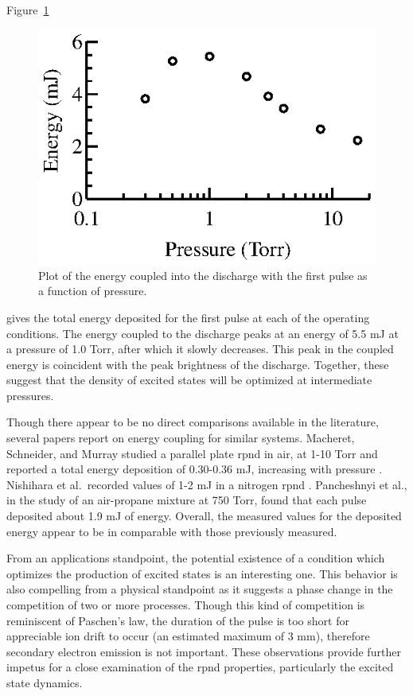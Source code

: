 Figure~\ref{fig:energies}
\begin{figure}
  \centering
  \includegraphics{./chapters/experiment/figures/energies.eps}
  \caption{Plot of the energy coupled into the discharge with the first pulse as
  a function of pressure.}
  \label{fig:energies}
\end{figure}
gives the total energy deposited for the first pulse at each of the operating
conditions. The energy coupled to the discharge peaks at an energy of 5.5 mJ at a
pressure of 1.0 Torr, after which it slowly decreases. This peak in the coupled
energy is coincident with the peak brightness of the discharge. Together, these
suggest that the density of excited states will be optimized at intermediate
pressures. 

Though there appear to be no direct comparisons available in the literature,
several papers report on energy coupling for similar systems. Macheret,
Schneider, and Murray studied a parallel plate \acs{rpnd} in air, at 1-10 Torr
and reported a total energy deposition of 0.30-0.36 mJ, increasing with pressure
\cite{Macheret2006}. Nishihara et al.\ recorded values of 1-2 mJ in a nitrogen
\acs{rpnd} \cite{Nishihara2006}. Pancheshnyi et al., in the study of an
air-propane mixture at 750 Torr, found that each pulse deposited about 1.9 mJ of
energy. Overall, the measured values for the deposited energy appear to be in
comparable with those previously measured.

From an applications standpoint, the potential existence of a condition which
optimizes the production of excited states is an interesting one. This behavior
is also compelling from a physical standpoint as it suggests a phase change in
the competition of two or more processes. Though this kind of competition is
reminiscent of Paschen's law, the duration of the pulse is too short for
appreciable ion drift to occur (an estimated maximum of 3 mm), therefore
secondary electron emission is not important. These observations provide further
impetus for a close examination of the \acs{rpnd} properties, particularly the
excited state dynamics.
